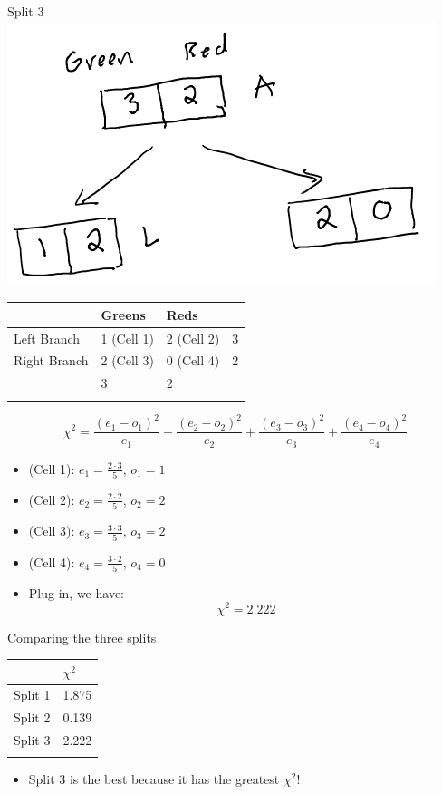 \documentclass[
  ignorenonframetext,
]{beamer}
\providecommand{\tightlist}{%
  \setlength{\itemsep}{0pt}\setlength{\parskip}{0pt}}\usepackage{longtable,booktabs,array}
\begin{document}
\begin{frame}{Split 3}
\label{split-3}
\includegraphics{images/im2.png}

\begin{longtable}[]{@{}llll@{}}
\toprule\noalign{}
& Greens & Reds & \\
\midrule\noalign{}
\endhead
Left Branch & 1 (Cell 1) & 2 (Cell 2) & 3 \\
Right Branch & 2 (Cell 3) & 0 (Cell 4) & 2 \\
& 3 & 2 & \\
\bottomrule\noalign{}
\end{longtable}

\[\chi^2 = \frac{(e_1-o_1)^2}{e_1}+\frac{(e_2-o_2)^2}{e_2}+\frac{(e_3-o_3)^2}{e_3}+\frac{(e_4-o_4)^2}{e_4}\]

\begin{itemize}
\item
  (Cell 1): \(e_1 = \frac{2\cdot 3}{5}\), \(o_1 = 1\)
\item
  (Cell 2): \(e_2 = \frac{2\cdot 2}{5}\), \(o_2 = 2\)
\item
  (Cell 3): \(e_3 = \frac{3\cdot 3}{5}\), \(o_3 = 2\)
\item
  (Cell 4): \(e_4 = \frac{3\cdot 2}{5}\), \(o_4 = 0\)
\item
  Plug in, we have: \[\chi^2 = 2.222\]
\end{itemize}
\end{frame}

\begin{frame}{Comparing the three splits}
\label{comparing-the-three-splits}
\begin{longtable}[]{@{}ll@{}}
\toprule\noalign{}
& \(\chi^2\) \\
\midrule\noalign{}
\endhead
Split 1 & 1.875 \\
Split 2 & 0.139 \\
Split 3 & 2.222 \\
\bottomrule\noalign{}
\end{longtable}

\begin{itemize}
\tightlist
\item
  Split 3 is the best because it has the greatest \(\chi^2\)!
\end{itemize}
\end{frame}
\end{document}
